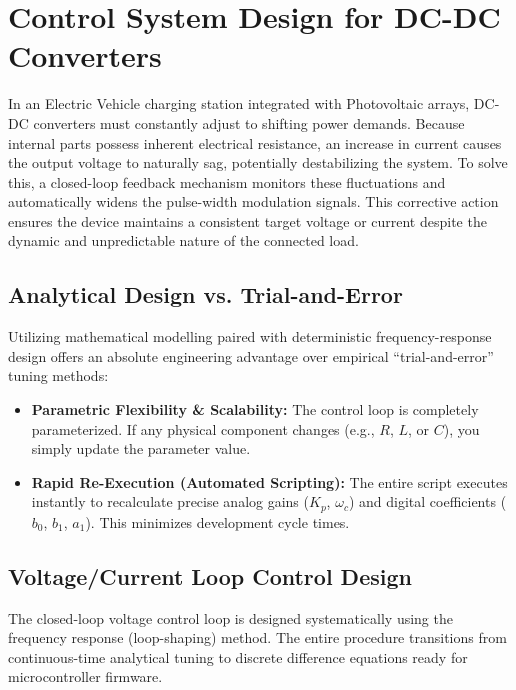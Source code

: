 
\section{Control System Design for DC-DC Converters}

In an Electric Vehicle charging station integrated with Photovoltaic arrays, DC-DC converters must constantly adjust to shifting power demands. Because internal parts possess inherent electrical resistance, an increase in current causes the output voltage to naturally sag, potentially destabilizing the system. To solve this, a closed-loop feedback mechanism monitors these fluctuations and automatically widens the pulse-width modulation signals. This corrective action ensures the device maintains a consistent target voltage or current despite the dynamic and unpredictable nature of the connected load.

\subsection{Analytical Design vs. Trial-and-Error}
Utilizing mathematical modelling paired with deterministic frequency-response design offers an absolute engineering advantage over empirical ``trial-and-error'' tuning methods:

\begin{itemize}
    \item \textbf{Parametric Flexibility \& Scalability:} The control loop is completely parameterized. If any physical component changes (e.g., $R$, $L$, or $C$), you simply update the parameter value.
    \item \textbf{Rapid Re-Execution (Automated Scripting):} The entire script executes instantly to recalculate precise analog gains ($K_p$, $\omega_c$) and digital coefficients ($b_0$, $b_1$, $a_1$). This minimizes development cycle times.
\end{itemize}

\subsection{Voltage/Current Loop Control Design}
The closed-loop voltage control loop is designed systematically using the frequency response (loop-shaping) method. The entire procedure transitions from continuous-time analytical tuning to discrete difference equations ready for microcontroller firmware.

